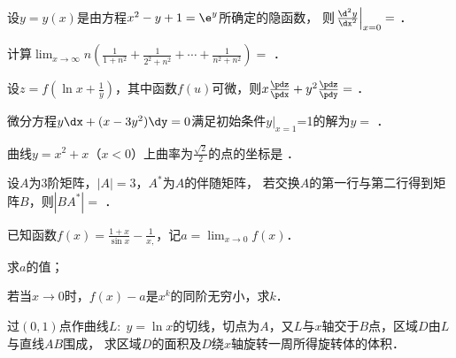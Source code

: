 \documentclass[plain,noanswer,medmath]{../../template/jnuexam}
\begin{document}
\begin{problem}
设$y = y(x)$是由方程$x^2 - y + 1 = \e^y$所确定的隐函数，
则$\left. \frac{\d^2y}{\dx^2} \right|_{x = 0} =$ \fillin{}．
\end{problem}


\begin{problem}
计算$\lim_{x \to \infty} n\left(\frac{1}{1 + n^2} + \frac{1}{2^2 + n^2}
+ \cdots + \frac{1}{n^2 + n^2} \right) =$ \fillin{}．
\end{problem}


\begin{problem}
设$z = f\left(\ln x + \frac{1}{y} \right)$，其中函数$f(u)$可微，则$x\frac{\pdz}{\pdx} + y^2\frac{\pdz}{\pdy} =$ \fillin{}．
\end{problem}


\begin{problem}
微分方程$y\dx + (x - 3y^2)\dy = 0$满足初始条件$y|_{x = 1}$=1的解为$y =$ \fillin{}．
\end{problem}


\begin{problem}
曲线$y = x^2 + x$（$x < 0$）上曲率为$\frac{\sqrt{2}}{2}$的点的坐标是 \fillin{}．
\end{problem}


\begin{problem}
设$A$为3阶矩阵，$|A| = 3$，$A^*$为$A$的伴随矩阵，
若交换$A$的第一行与第二行得到矩阵$B$，则$\left| BA^* \right| =$ \fillin{}．
\end{problem}




\begin{problem}[points=10]
已知函数$f(x) = \frac{1 + x}{\sin x} - \frac{1}{x,}$，记$a = \lim_{x \to 0} f(x)$．\par
\begin{enumerate*}
\item 求$a$的值；
\item 若当$x \to 0$时，$f(x) - a$是$x^k$的同阶无穷小，求$k$．
\end{enumerate*}
\end{problem}




\begin{problem}[points=10]
过$(0,1)$点作曲线$L:\;y = \ln x$的切线，切点为$A$，又$L$与$x$轴交于$B$点，区域$D$由$L$与直线$AB$围成，
求区域$D$的面积及$D$绕$x$轴旋转一周所得旋转体的体积．
\end{problem}
\end{document}
